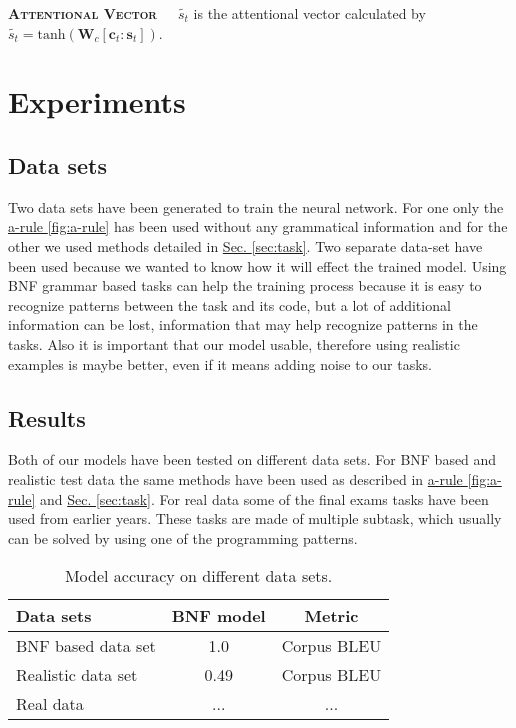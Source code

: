 \documentclass[12pt]{article}
\newcommand{\refThis}[2]{\hyperref[#1]{#2 \ref{#1}}}
\begin{document}
\textbf{\textsc{Attentional Vector}}\ \ \ $\tilde{s_{t}}$ is the attentional vector calculated by $\tilde{s_{t}} = \text{tanh}(\textbf{W}_{c}[\textbf{c}_{t} : \textbf{s}_{t}])$.    

\section{Experiments}
    \subsection{Data sets}
        Two data sets have been generated to train the neural network. For one only the \refThis{fig:a-rule}{a-rule} has been used without any grammatical information and for the other we used methods detailed in \refThis{sec:task}{Sec.}. Two separate data-set have been used because we wanted to know how it will effect the trained model. Using BNF grammar based tasks can help the training process because it is easy to recognize patterns between the task and its code, but a lot of additional information can be lost, information that may help recognize patterns in the tasks. Also it is important that our model usable, therefore using realistic examples is maybe better, even if it means adding noise to our tasks.   
        
        \subsection{Results}
        Both of our models have been tested on different data sets. For BNF based and realistic test data the same methods have been used as described in \refThis{fig:a-rule}{a-rule} and \refThis{sec:task}{Sec.}. For real data some of the final exams tasks have been used from earlier years. These tasks are made of multiple subtask, which usually can be solved by using one of the programming patterns. 
        \begin{table}[h]
            \normalsize
            \centering
            \begin{tabular}{l|c|c}		 
            Data sets  &
            BNF  model &
            Metric \\	
            \hline
            BNF based data set & 1.0 & Corpus BLEU \\
            Realistic data set & 0.49 & Corpus BLEU \\
            Real data & ... & ...\\
            \end{tabular}
            \caption{Model accuracy on different data sets.}
            \label{model_acc}
        \end{table}
\end{document}
